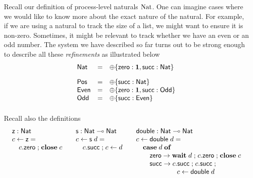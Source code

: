 \documentclass[submission,copyright,creativecommons]{eptcs}
\newcommand{\m}[1]{\mathsf{#1}}
\newcommand{\mb}[1]{\mbox{\bf #1}}
\newcommand{\semi}{\mathrel{;}}
\begin{document}
Recall our definition of process-level naturals $\nat$. One can imagine cases where we would like to know more about the exact nature of the natural. For example, if we are using a natural to track the size of a list, we might want to ensure it is non-zero. Sometimes, it might be relevant to track whether we have an even or an odd number. The system we have described so far turns out to be strong enough to describe all these \emph{refinements} as illustrated below
\[
\begin{array}{lcll}
  \m{Nat} & = & \internal\{\m{zero} : \terminate, \m{succ} : \m{Nat}\} \\[1em]
  \m{Pos} & = & \internal\{\m{succ} : \m{Nat}\} \\
  \m{Even} & = & \internal\{\m{zero} : \terminate, \m{succ} : \m{Odd}\} \\
  \m{Odd} & = & \internal\{\m{succ} : \m{Even}\} \\[1em]
\end{array}
\]
Recall also the definitions
\[
\begin{array}{l@{\hspace{2em}}l@{\hspace{2em}}l}
  \m{z} : \m{Nat} & \m{s} : \m{Nat} \lolli \m{Nat} & \m{double} : \m{Nat} \lolli \m{Nat} \\
  c \leftarrow \m{z} = & c \leftarrow \m{s}\; d = & c \leftarrow \m{double}\; d = \\
  \quad c.\m{zero} \semi \mb{close}\; c & \quad c.\m{succ} \semi c \leftarrow d & \quad \mb{case}\; d\; \mb{of} \\
& & \quad\quad \m{zero} \rightarrow \mb{wait}\; d \semi c.\m{zero} \semi \mb{close}\; c \\
& & \quad\quad \m{succ} \rightarrow c.\m{succ} \semi c.\m{succ} \semi \\
& & \hspace{6em} c \leftarrow \m{double}\; d
\end{array}
\]
\end{document}

